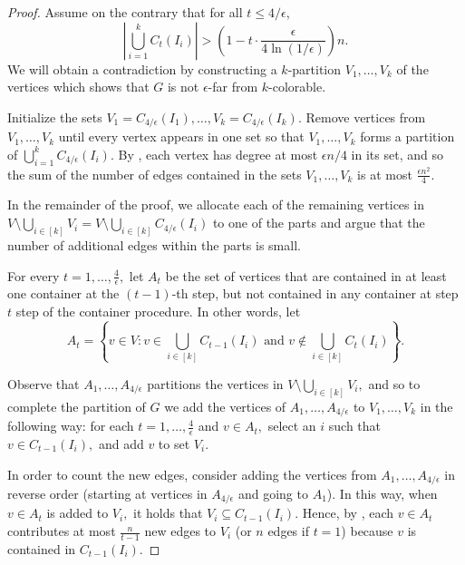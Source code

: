 \documentclass[11pt]{article}
\begin{document}
\begin{proof}
Assume on the contrary that for all $t \le 4/\epsilon$, 
\begin{equation}
\label{eqn:containers-union}
\left|\bigcup_{i=1}^k C_t(I_i)\right| > \left( 1 - t \cdot \frac{\epsilon}{4\ln (1/\epsilon)} \right)n.
\end{equation}
We will obtain a contradiction by constructing a $k$-partition $V_1,\dots,V_k$ of the vertices which shows that $G$ is not $\epsilon$-far from $k$-colorable.
    
Initialize the sets $V_1=C_{4/\epsilon}(I_1),\dots,V_k=C_{4/\epsilon}(I_k).$ Remove vertices from $V_1,\dots,V_k$ until every vertex appears in one set so that $V_1,\dots,V_k$ forms a partition of $\bigcup_{i=1}^k C_{4/\epsilon}(I_i).$ By , each vertex has degree at most $\epsilon n/4$ in its set, and so the sum of the number of edges contained in the sets $V_1, \dots, V_k$ is at most $\frac{\epsilon n^2}{4}.$

    In the remainder of the proof, we allocate each of the remaining vertices in $V \setminus \bigcup_{i \in [k]}V_i= V \setminus \bigcup_{i \in [k]} C_{4/\epsilon}(I_i)$ to one of the parts and argue that the number of additional edges within the parts is small.
    
    For every $t = 1, \dots, \frac{4}{\epsilon},$ let $A_t$ be the set of vertices that are contained in at least one container at the $(t-1)$-th step, but not contained in any container at step $t$ step of the container procedure. In other words, let \[A_t = \left\{v \in V : v \in \bigcup_{i \in [k]} C_{t-1}(I_i) \textrm{ and } v \notin \bigcup_{i \in [k]} C_{t}(I_i)\right\}.\]
    
    Observe that $A_1,\dots,A_{4/\epsilon}$ partitions the vertices in $V \setminus \bigcup_{i \in [k]}V_i,$ and so to complete the partition of $G$ we add the vertices of $A_1, \dots, A_{4/\epsilon}$ to $V_1,\dots,V_k$ in the following way: for each $t=1,\dots, \frac{4}{\epsilon}$ and $v \in A_t,$ select an $i$ such that $v \in C_{t-1}(I_i),$ and add $v$ to set $V_i.$

    In order to count the new edges, consider adding the vertices from $A_1,\dots,A_{4/\epsilon}$ in reverse order (starting at vertices in $A_{4/\epsilon}$ and going to $A_1$). In this way, when $v \in A_t$ is added to $V_i,$ it holds that $V_i \subseteq C_{t-1}(I_i).$ Hence, by , each $v \in A_t$ contributes at most $\frac{n}{t-1}$ new edges to $V_i$ (or $n$ edges if $t=1$) because $v$ is contained in $C_{t-1}(I_i).$
    

\end{proof}
\end{document}
